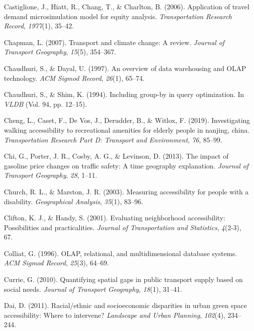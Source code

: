 \documentclass[
11pt, %
oneside, %
english, %
singlespacing, %
]{macthesis} %
\newlength{\cslhangindent}
\newenvironment{CSLReferences}[2] %
{\begin{list}{}{%
	\setlength{\itemindent}{0pt}
	\setlength{\leftmargin}{0pt}
	\setlength{\parsep}{0pt}
	\ifodd #1
	\setlength{\leftmargin}{\cslhangindent}
	\setlength{\itemindent}{-1\cslhangindent}
	\fi
	\setlength{\itemsep}{#2\baselineskip}}}
{\end{list}}
\begin{document}
\begin{CSLReferences}{1}{0}
Castiglione, J., Hiatt, R., Chang, T., \& Charlton, B. (2006). Application of travel demand microsimulation model for equity analysis. \emph{Transportation Research Record}, \emph{1977}(1), 35--42.

Chapman, L. (2007). Transport and climate change: A review. \emph{Journal of Transport Geography}, \emph{15}(5), 354--367.

Chaudhuri, S., \& Dayal, U. (1997). An overview of data warehousing and OLAP technology. \emph{ACM Sigmod Record}, \emph{26}(1), 65--74.

Chaudhuri, S., \& Shim, K. (1994). Including group-by in query optimization. In \emph{VLDB} (Vol. 94, pp. 12--15).

Cheng, L., Caset, F., De Vos, J., Derudder, B., \& Witlox, F. (2019). Investigating walking accessibility to recreational amenities for elderly people in nanjing, china. \emph{Transportation Research Part D: Transport and Environment}, \emph{76}, 85--99.

Chi, G., Porter, J. R., Cosby, A. G., \& Levinson, D. (2013). The impact of gasoline price changes on traffic safety: A time geography explanation. \emph{Journal of Transport Geography}, \emph{28}, 1--11.

Church, R. L., \& Marston, J. R. (2003). Measuring accessibility for people with a disability. \emph{Geographical Analysis}, \emph{35}(1), 83--96.

Clifton, K. J., \& Handy, S. (2001). Evaluating neighborhood accessibility: Possibilities and practicalities. \emph{Journal of Transportation and Statistics}, \emph{4}(2-3), 67.

Colliat, G. (1996). OLAP, relational, and multidimensional database systems. \emph{ACM Sigmod Record}, \emph{25}(3), 64--69.

Currie, G. (2010). Quantifying spatial gaps in public transport supply based on social needs. \emph{Journal of Transport Geography}, \emph{18}(1), 31--41.

Dai, D. (2011). Racial/ethnic and socioeconomic disparities in urban green space accessibility: Where to intervene? \emph{Landscape and Urban Planning}, \emph{102}(4), 234--244.


\end{CSLReferences}
\end{document}
